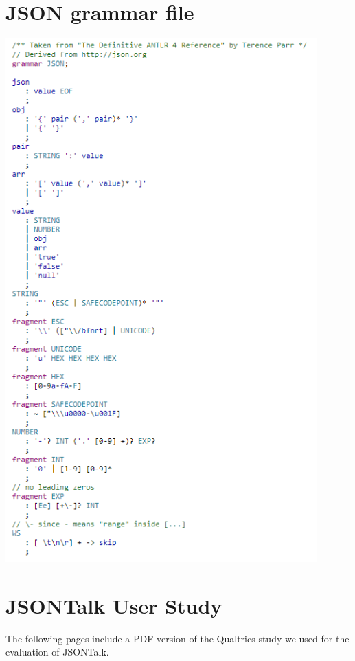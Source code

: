 \documentclass{l4proj}
\begin{document}
\begin{appendices}
\section{JSON grammar file}
\label{appendix:grammar}
\begin{center}
\includegraphics[width =0.9\textwidth]{dissertation/images/json grammar.png}
\end{center}

\pagebreak


\section{JSONTalk User Study}
\label{appendix:study}
The following pages include a PDF version of the Qualtrics study we used for the evaluation of JSONTalk.
\centering



\end{appendices}
\end{document}
